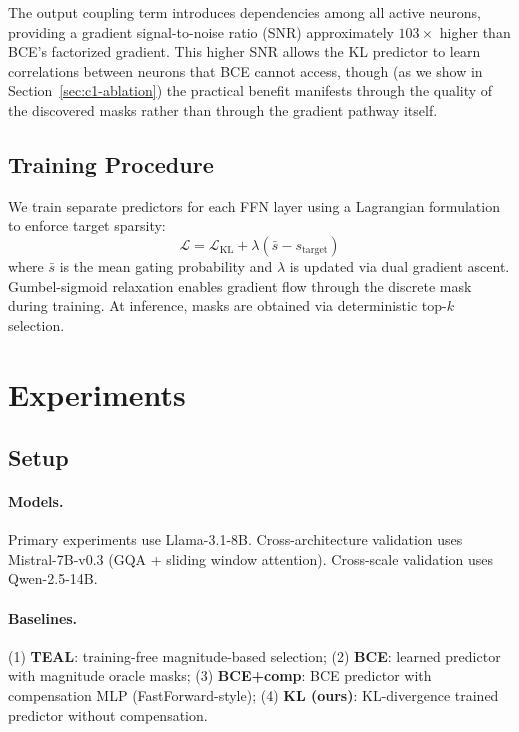 \documentclass[11pt,a4paper]{article}
\begin{document}
The output coupling term introduces dependencies among all active neurons, providing a gradient signal-to-noise ratio (SNR) approximately $103\times$ higher than BCE's factorized gradient. This higher SNR allows the KL predictor to learn correlations between neurons that BCE cannot access, though (as we show in Section~\ref{sec:c1-ablation}) the practical benefit manifests through the quality of the discovered masks rather than through the gradient pathway itself.

\subsection{Training Procedure}

We train separate predictors for each FFN layer using a Lagrangian formulation to enforce target sparsity:
\begin{equation}
    \mathcal{L} = \mathcal{L}_{\text{KL}} + \lambda \left( \bar{s} - s_{\text{target}} \right)
\end{equation}
where $\bar{s}$ is the mean gating probability and $\lambda$ is updated via dual gradient ascent. Gumbel-sigmoid relaxation enables gradient flow through the discrete mask during training. At inference, masks are obtained via deterministic top-$k$ selection.

\section{Experiments}
\label{sec:experiments}

\subsection{Setup}

\paragraph{Models.} Primary experiments use Llama-3.1-8B. Cross-architecture validation uses Mistral-7B-v0.3 (GQA + sliding window attention). Cross-scale validation uses Qwen-2.5-14B.

\paragraph{Baselines.} (1) \textbf{TEAL}: training-free magnitude-based selection; (2) \textbf{BCE}: learned predictor with magnitude oracle masks; (3) \textbf{BCE+comp}: BCE predictor with compensation MLP (FastForward-style); (4) \textbf{KL (ours)}: KL-divergence trained predictor without compensation.
\end{document}
